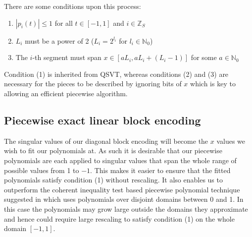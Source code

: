 There are some conditions upon this process:
\begin{enumerate}[label=(\arabic*)]
    \item $|p_i(t)| \leq 1$ for all $t \in [-1,1]$ and $i \in \mathbb{Z}_S$
    \item $L_i$ must be a power of 2 ($L_i = 2^{l_i}$ for $l_i \in \mathbb{N}_0$)
    \item The $i$-th segment must span $x \in [aL_i, aL_i + (L_i - 1)]$ for some $a \in \mathbb{N}_0$
\end{enumerate}

Condition (1) is inherited from QSVT, whereas conditions (2) and (3) are necessary for the pieces to be described by ignoring bits of $x$ which is key to allowing an efficient piecewise algorithm.

\subsection{Piecewise exact linear block encoding}
\label{section:linear_block}
The singular values of our diagonal block encoding will become the $x$ values we wish to fit our polynomials at. As such it is desirable that our piecewise polynomials are each applied to singular values that span the whole range of possible values from 1 to $-1$. This makes it easier to ensure that the fitted polynomials satisfy condition (1) without rescaling. It also enables us to outperform the coherent inequality test based piecewise polynomial technique suggested in \cite{mcardleQuantumStatePreparation2022} which uses polynomials over disjoint domains between 0 and 1. In this case the polynomials may grow large outside the domains they approximate and hence could require large rescaling to satisfy condition (1) on the whole domain $[-1, 1]$.

